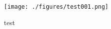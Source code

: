 
\begin{figure}[ht]
\centering
\texttt{[image: ./figures/test001.png]}
\caption{test} \label{test00_fig1}
\end{figure}